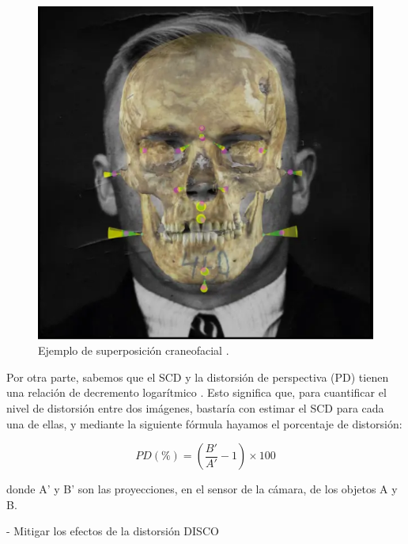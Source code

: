 \begin{figure}[h]
	\centering
	\includegraphics[scale=0.25]{imagenes/cap1/skull_superimposition.png}
	\caption{Ejemplo de superposición craneofacial \cite{23}.}
	\label{fig2}
\end{figure}


Por otra parte, sabemos que el SCD y la distorsión de perspectiva (PD) tienen una relación de decremento logarítmico \cite{23}. Esto significa que, para cuantificar el nivel de distorsión entre dos imágenes, bastaría con estimar el SCD para cada una de ellas, y mediante la siguiente fórmula hayamos el porcentaje de distorsión:

$$PD(\%) = (\frac{B'}{A'} - 1) \times 100$$

donde A' y B' son las proyecciones, en el sensor de la cámara, de los objetos A y B.

- Mitigar los efectos de la distorsión  DISCO


